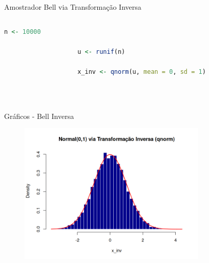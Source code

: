 \documentclass{beamer} %
\begin{document}
	\begin{frame}[fragile]{Amostrador Bell via Transformação Inversa}
		\begin{columns}
			
			\begin{column}{0.85\textwidth}
				\begin{lstlisting}[language=R]
					n <- 10000
					
					u <- runif(n)
					
					x_inv <- qnorm(u, mean = 0, sd = 1)
					
							
				\end{lstlisting}
			\end{column}
			
			\begin{column}{0.15\textwidth}
				\href{https://github.com/andresavassi/Trabalho-1---MCCD-II/blob/main/bell_inversa.R}{}
				
				\vspace{0.5cm}
				
			\end{column}
			
		\end{columns}
	\end{frame}
	
	\begin{frame}{Gráficos - Bell Inversa}
	\begin{figure}[h]
		\centering
		\includegraphics[width=0.8\textwidth]{graf_bell_inv.png}
	\end{figure}
\end{frame}
\end{document}

